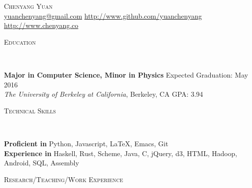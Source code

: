 \documentclass[9pt]{article}
\newenvironment{changemargin}[2]{%
  \begin{list}{}{%
      \setlength{\topsep}{0pt}%
      \setlength{\leftmargin}{#1}%
      \setlength{\rightmargin}{#2}%
      \setlength{\listparindent}{\parindent}%
      \setlength{\itemindent}{\parindent}%
      \setlength{\parsep}{\parskip}%
    }%
  \item[]}{\end{list}
}
\newcommand{\lineover}{
  \begin{changemargin}{-0.05in}{-0.05in}
    \vspace*{-8pt}
    \hrulefill \\
    \vspace*{-2pt}
  \end{changemargin}
}
\newcommand{\header}[1]{
  \begin{changemargin}{-0.5in}{-0.5in}
    \scshape{#1}\\
    \lineover
  \end{changemargin}
}
\newcommand{\contact}[2]{
  \begin{changemargin}{-0.5in}{-0.5in}
    \begin{center}
      {\Large \scshape {#1}}\\ \smallskip
      {#2}\\ \smallskip
    \end{center}
  \end{changemargin}
}
\newenvironment{body} {
  \vspace*{-16pt}
  \begin{changemargin}{-0.25in}{-0.5in}
  }
  {\end{changemargin}
}
\begin{document}
\contact{Chenyang Yuan}{\url{yuanchenyang@gmail.com}  \quad \url{http://www.github.com/yuanchenyang} \quad \url{http://www.chenyang.co}}

\header{Education}

\begin{body}
  \vspace{14pt}
  \textbf{Major in Computer Science, Minor in Physics} \hfill Expected Graduation: May 2016 \\
  \emph{The University of Berkeley at California}, Berkeley, CA{} \hfill GPA: 3.94 \\
\end{body}

\smallskip

\header{Technical Skills}

\begin{body}
  \vspace{14pt}
  \textbf{Proficient in} Python, Javascript, \LaTeX, Emacs, Git \\
  \textbf{Experience in} Haskell, Rust, Scheme, Java, C, jQuery, d3, HTML, Hadoop, Android, SQL, Assembly
\end{body}

\smallskip



\header{Research/Teaching/Work Experience}
\end{document}
